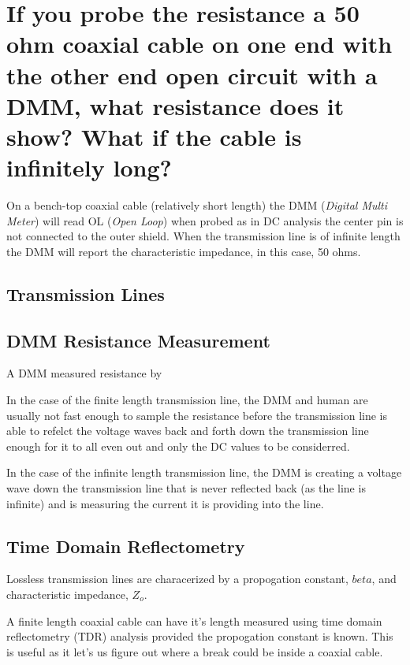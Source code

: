 \documentclass[main.tex]{subfiles}
\begin{document}
\section{If you probe the resistance a 50 ohm coaxial cable on one end with the other end open circuit with a DMM, what resistance does it show? What if the cable is infinitely long?}


\noindent On a bench-top coaxial cable (relatively short length) the DMM (\textit{Digital Multi Meter}) will read OL (\textit{Open Loop}) when probed as in DC analysis the center pin is not connected to the outer shield. When the transmission line is of infinite length the DMM will report the characteristic impedance, in this case, 50 ohms.

\subsection{Transmission Lines}


\subsection{DMM Resistance Measurement}
A DMM measured resistance by 

In the case of the finite length transmission line, the DMM and human are usually not fast enough to sample the resistance before the transmission line is able to refelct the voltage waves back and forth down the transmission line enough for it to all even out and only the DC values to be considerred.

In the case of the infinite length transmission line, the DMM is creating a voltage wave down the transmission line that is never reflected back (as the line is infinite) and is measuring the current it is providing into the line. 

\subsection{Time Domain Reflectometry}
Lossless transmission lines are characerized by a propogation constant, $beta$, and characteristic impedance, $Z_o$. 

A finite length coaxial cable can have it's length measured using time domain reflectometry (TDR) analysis provided the propogation constant is known. This is useful as it let's us figure out where a break could be inside a coaxial cable. 

\end{document}
